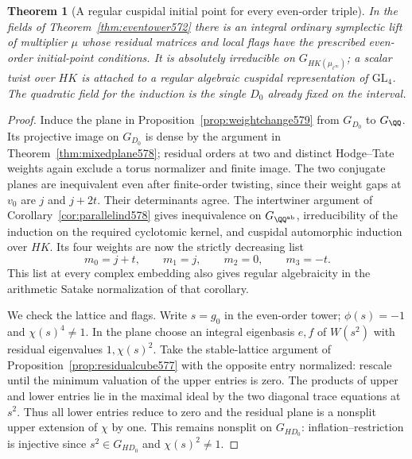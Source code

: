 \documentclass[a4paper,11pt]{article}
\newtheorem{theorem}[proposition]{Theorem}
\theoremstyle{definition}
\theoremstyle{remark}
\numberwithin{equation}{section}
\begin{document}
\begin{theorem}[A regular cuspidal initial point for every even-order triple]
\leavevmode\label{thm:regularind579}
In the fields of Theorem~\ref{thm:eventower572} there is an
integral ordinary symplectic lift of multiplier \(\mu\)
whose residual matrices and local flags have the prescribed
even-order initial-point conditions. It is absolutely
irreducible on \(G_{HK(\mu_{\ell^\infty})}\); a scalar
twist over \(HK\) is attached to a regular algebraic
cuspidal representation of \(\mathrm{GL}_4\). The quadratic
field for the induction is the single \(D_0\) already fixed
on the interval.
\end{theorem}
\begin{proof}
Induce the plane in Proposition~\ref{prop:weightchange579}
from \(G_{D_0}\) to \(G_\QQ\). Its projective image on
\(G_{D_0}\) is dense by the argument in
Theorem~\ref{thm:mixedplane578}; residual orders at two
and distinct Hodge--Tate weights again exclude a torus
normalizer and finite image. The two conjugate planes
are inequivalent even after finite-order twisting, since
their weight gaps at \(v_0\) are \(j\) and \(j+2t\).
Their determinants agree. The intertwiner argument of
Corollary~\ref{cor:parallelind578} gives inequivalence on
\(G_{\QQ^{\rm ab}}\), irreducibility of the induction on
the required cyclotomic kernel, and cuspidal automorphic
induction over \(HK\). Its four weights are now the strictly
decreasing list
\[
                m_0=j+t,\qquad m_1=j,\qquad m_2=0,\qquad m_3=-t .
\]
This list at every complex embedding also gives regular
algebraicity in the arithmetic Satake normalization of
that corollary.

We check the lattice and flags. Write \(s=g_0\) in the
even-order tower; \(\phi(s)=-1\) and \(\chi(s)^4\ne1\).
In the plane choose an integral eigenbasis \(e,f\) of
\(W(s^2)\) with residual eigenvalues \(1,\chi(s)^2\).
Take the stable-lattice argument of
Proposition~\ref{prop:residualcube577} with the opposite
entry normalized: rescale until the minimum valuation of
the upper entries is zero. The products of upper and lower
entries lie in the maximal ideal by the two diagonal trace
equations at \(s^2\). Thus all lower entries reduce to zero
and the residual plane is a nonsplit upper extension of
\(\chi\) by one. This remains nonsplit on \(G_{HD_0}\):
inflation--restriction is injective since \(s^2\in G_{HD_0}\)
and \(\chi(s)^2\ne1\).


\end{proof}
\end{document}
